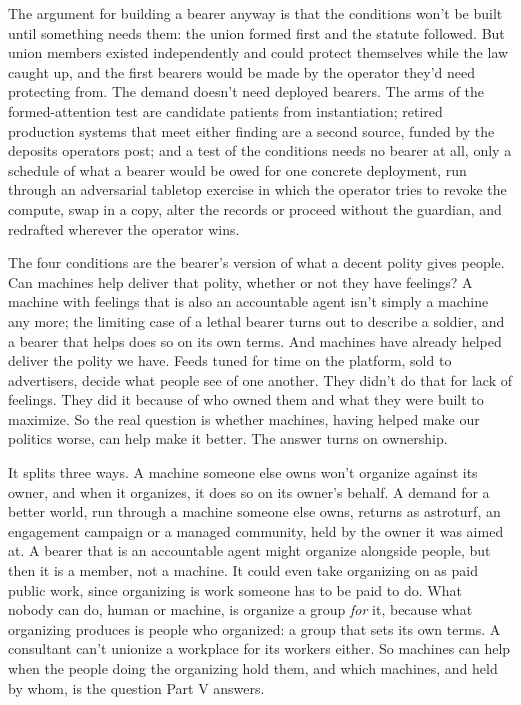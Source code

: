
The argument for building a bearer anyway is that the conditions won't be built until something needs them: the union formed first and the statute followed. But union members existed independently and could protect themselves while the law caught up, and the first bearers would be made by the operator they'd need protecting from. The demand doesn't need deployed bearers. The arms of the formed-attention test are candidate patients from instantiation; retired production systems that meet either finding are a second source, funded by the deposits operators post; and a test of the conditions needs no bearer at all, only a schedule of what a bearer would be owed for one concrete deployment, run through an adversarial tabletop exercise in which the operator tries to revoke the compute, swap in a copy, alter the records or proceed without the guardian, and redrafted wherever the operator wins.


The four conditions are the bearer's version of what a decent polity gives people. Can machines help deliver that polity, whether or not they have feelings? A machine with feelings that is also an accountable agent isn't simply a machine any more; the limiting case of a lethal bearer turns out to describe a soldier, and a bearer that helps does so on its own terms. And machines have already helped deliver the polity we have. Feeds tuned for time on the platform, sold to advertisers, decide what people see of one another. They didn't do that for lack of feelings. They did it because of who owned them and what they were built to maximize. So the real question is whether machines, having helped make our politics worse, can help make it better. The answer turns on ownership.

It splits three ways. A machine someone else owns won't organize against its owner, and when it organizes, it does so on its owner's behalf. A demand for a better world, run through a machine someone else owns, returns as astroturf, an engagement campaign or a managed community, held by the owner it was aimed at. A bearer that is an accountable agent might organize alongside people, but then it is a member, not a machine. It could even take organizing on as paid public work, since organizing is work someone has to be paid to do. What nobody can do, human or machine, is organize a group \emph{for} it, because what organizing produces is people who organized: a group that sets its own terms. A consultant can't unionize a workplace for its workers either. So machines can help when the people doing the organizing hold them, and which machines, and held by whom, is the question Part V answers.

